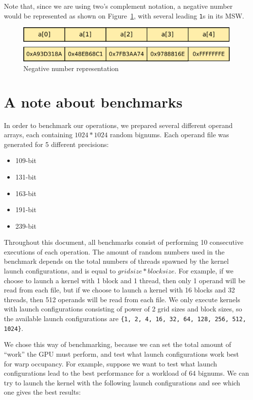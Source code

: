 \documentclass[12pt, a4paper]{report}
\begin{document}
Note that, since we are using two's complement notation, a negative number would
be represented as shown on Figure~\ref{fig:negative_number_representation}, with
several leading \verb+1+s in its MSW.

\begin{figure}[h]
\centering
\includegraphics[scale=0.5]{figs/negative_number_representation}
\caption{Negative number representation}
\label{fig:negative_number_representation}
\end{figure}

\section{A note about benchmarks}
In order to benchmark our operations, we prepared several different operand arrays, each
containing $1024*1024$ random bignums.
Each operand file was generated for 5 different precisions:

\begin{itemize}
\item 109-bit
\item 131-bit
\item 163-bit
\item 191-bit
\item 239-bit
\end{itemize}

Throughout this document, all benchmarks consist of performing 10 consecutive
executions of each operation.
The amount of random numbers used in the benchmark depends on the total numbers
of threads spawned by the kernel launch configurations, and is equal to
$gridsize*blocksize$.
For example, if we choose to launch a kernel with 1 block and 1 thread, then
only 1 operand will be read from each file, but if we choose to launch a kernel
with 16 blocks and 32 threads, then 512 operands will be read from each file.
We only execute kernels with launch configurations consisting of power of 2
grid sizes and block sizes, so the available launch configurations are
\verb+{1, 2, 4, 16, 32, 64, 128, 256, 512, 1024}+.

We chose this way of benchmarking, because we can set the total amount of
``work'' the GPU must perform, and test what launch configurations work best for
warp occupancy.
For example, suppose we want to test what launch configurations lead to the best
performance for a workload of 64 bignums.
We can try to launch the kernel with the following launch configurations and see
which one gives the best results:
\end{document}
